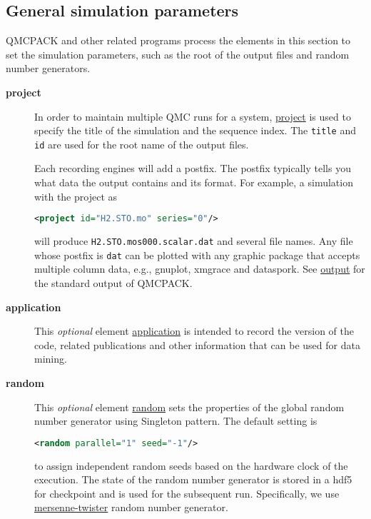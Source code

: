 \subsection{General simulation parameters}

QMCPACK and other related programs process the elements in this section to set
the simulation parameters, such as the root of the output files and random
number generators.  

\begin{description}
\item[\textbf{project}{}]\label{project.sec}
In order to maintain multiple QMC runs for a system,
\hyperlink{project.element}{project} is used to specify the title of the
simulation and the sequence index. The \texttt{title} and \texttt{id} are used
for the root name of the output files. 
 
Each recording engines will add a postfix. The postfix typically tells you what
data the output contains and its format.  For example, a simulation with the
project as
  
\begin{lstlisting}[language=XML,emph={project},emphstyle=\bfseries\color{blue}]
<project id="H2.STO.mo" series="0"/>\end{lstlisting} 
will produce
\nolinkurl{H2.STO.mos000.scalar.dat} and several file names. Any file whose
postfix is \nolinkurl{dat} can be plotted with any graphic package that accepts
multiple column data, e.g., gnuplot, xmgrace and dataspork. See
\hyperlink{output.sec}{output} for the standard output of QMCPACK. 

\item[\textbf{application}{}]
This \emph{optional} element \hyperlink{application.element}{application} is
intended to record the version of the code, related publications and other
information that can be used for data mining. 

\item[\textbf{random}{}]
This \emph{optional} element \hyperlink{random.element}{random} sets the
properties of the global random number generator using Singleton pattern. The
default setting is
  
\begin{lstlisting}[language=XML,emph={random},emphstyle=\bfseries\color{blue}]
<random parallel="1" seed="-1"/>\end{lstlisting}
 to assign independent random seeds based on the hardware clock of the
 execution. The state of the random number generator is stored in a hdf5 for
 checkpoint and is used for the subsequent run.  Specifically, we use
 \href{http://www.boost.org/boost/random/mersenne_twister.hpp}{
 mersenne-{}twister} random number generator.
\end{description}
   
